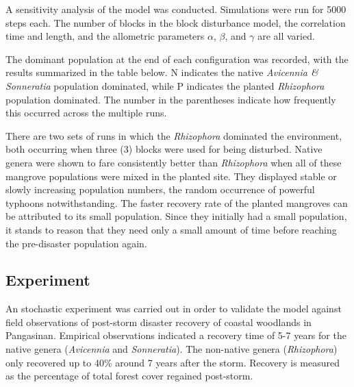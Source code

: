 A sensitivity analysis of the model was conducted. Simulations were run for 5000 steps each.
The number of blocks in the block disturbance model, the correlation time and length, and the allometric parameters $\alpha$, $\beta$, and $\gamma$ are all varied.

The dominant population at the end of each configuration was recorded, with the results summarized in the table below. N indicates the native \emph{Avicennia \& Sonneratia} population dominated, while P indicates the planted \emph{Rhizophora} population dominated. The number
in the parentheses indicate how frequently this occurred across the multiple runs.


There are two sets of runs in which the \emph{Rhizophora} dominated the
environment, both occurring when three (3) blocks were used for 
being disturbed. Native genera were shown to fare consistently better
than \emph{Rhizophora} when all of these mangrove populations were mixed
in the planted site. They displayed stable or slowly increasing
population numbers, the random occurrence of powerful typhoons
notwithstanding. The faster recovery rate of the planted mangroves can
be attributed to its small population. Since they initially had a small
population, it stands to reason that they need only a small amount of
time before reaching the pre-disaster population again.

\subsection{Experiment}

An stochastic experiment was carried out in order to validate the model against 
field observations of post-storm disaster recovery of coastal woodlands in Pangasinan. Empirical observations indicated a recovery time of 5-7 years for
the native genera (\textit{Avicennia} and \textit{Sonneratia}). The non-native genera (\textit{Rhizophora}) only recovered up to 40\% around 7 years after the storm. Recovery is measured as the percentage of total forest cover regained post-storm.

